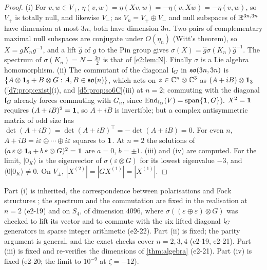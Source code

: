 \begin{proof}
(i) For $v,w\in V_+$, $\eta(v,w)=\eta(Xv,w)=-\eta(v,Xw)=-\eta(v,w)$, so $V_+$ is totally null, and likewise $V_-$; as $V_n=V_+\oplus V_-$ and
null subspaces of $\mathbb{R}^{3n,3n}$ have dimension at most $3n$, both have dimension $3n$. Two pairs of complementary maximal null subspaces are
conjugate under $O(\eta_n)$ (Witt's theorem), so $X=gK_ng^{-1}$, and a lift $\hat g$ of $g$ to the Pin group gives
$\sigma(X)=\hat g\sigma(K_n)\hat g^{-1}$. The spectrum of $\sigma(K_n)=N-\tfrac{3n}2$ is that of \cref{e2:lem:N}. Finally $\sigma$ is a Lie algebra
homomorphism. (ii) The commutant of the diagonal $\mathfrak l_G$ in $\mathfrak{so}(3n,3n)$ is $\{A\otimes\mathbf 1_6+B\otimes G:A,B\in\mathfrak{so}(n)\}$, which acts on $z\in\mathbb{C}^n\otimes\mathbb{C}^3$
as $(A+iB)\otimes\mathbf 1_3$ (\cref{d7:prop:exist}(i), and \cref{d5:prop:so6C}(iii) at $n=2$; commuting with the diagonal $\mathfrak l_G$ already forces commuting with $G_n$, since $\operatorname{End}_{\mathfrak l_G}(V)=\operatorname{span}\{\mathbf 1,G\}$). $X^2=\mathbf 1$ requires $(A+iB)^2=\mathbf 1$, so $A+iB$ is invertible; but a complex antisymmetric
matrix of odd size has $\det(A+iB)=\det(A+iB)^{\!\top}=-\det(A+iB)=0$. For even $n$, $A+iB=i\varepsilon\oplus\cdots\oplus i\varepsilon$ squares to $\mathbf 1$. At
$n=2$ the solutions of $(a\,\varepsilon\otimes\mathbf 1_6+b\,\varepsilon\otimes G)^2=\mathbf 1$ are $a=0$, $b=\pm1$. (iii) and (iv) are computed. For the limit, $|0_K\rangle$ is the
eigenvector of $\sigma(\varepsilon\otimes G)$ for its lowest eigenvalue $-3$, and $\langle0|0_K\rangle\neq0$. On $V_\pm$, $|X^{(2)}|=|GX^{(1)}|=|X^{(1)}|$.
\end{proof}

Part (i) is inherited, the correspondence between polarisations and Fock structures \cite{Chevalley54,Berezin66}; the spectrum and the
commutation are fixed in the realisation at $n=2$ (e2-19) and on $S_4$, of dimension $4096$, where $\sigma((\varepsilon\oplus\varepsilon)\otimes G)$ was
checked to lift its vector and to commute with the six lifted diagonal $\mathfrak l_G$ generators in sparse integer arithmetic (e2-22). Part (ii) is
fixed; the parity argument is general, and the exact checks cover $n=2,3,4$ (e2-19, e2-21). Part (iii) is fixed and re-verifies the
dimensions of \cref{thm:algebra} (e2-21). Part (iv) is fixed (e2-20; the limit to $10^{-9}$ at $\zeta=-12$).

